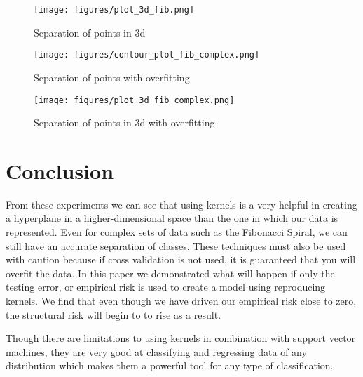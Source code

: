 \documentclass[11pt, twoside]{article}   	%
\begin{document}
\begin{figure}[h]
\centering
\texttt{[image: figures/plot\_3d\_fib.png]}
\caption{Separation of points in 3d}
\label{fig:plot_3d_fib} 
\end{figure}

\begin{figure}[h]
\centering
\texttt{[image: figures/contour\_plot\_fib\_complex.png]}
\caption{Separation of points with overfitting}
\label{fig:sigma_gamma_fib_overfit} 
\end{figure}


\begin{figure}[h]
\centering
\texttt{[image: figures/plot\_3d\_fib\_complex.png]}
\caption{Separation of points in 3d with overfitting}
\label{fig:plot_3d_fib_overfit} 
\end{figure}

\section{Conclusion}
From these experiments we can see that using kernels is a very helpful in creating a hyperplane
in a higher-dimensional space than the one in which our data is represented. 
Even for complex sets of data such as the Fibonacci Spiral, 
we can still have an accurate separation of classes. These techniques must also be used
with caution because if cross validation is not used, it is guaranteed that you will overfit the data. In this paper we
 demonstrated what will 
happen if only the testing error, or empirical risk is used to create a model using reproducing 
kernels. We find that even though we have driven our empirical risk close to zero, the structural 
risk will begin to to rise as a result. 

Though there are limitations to using kernels in combination with support vector machines, they are very 
good at classifying and regressing data of any distribution which makes them a powerful tool 
for any type of classification.



\end{document}
